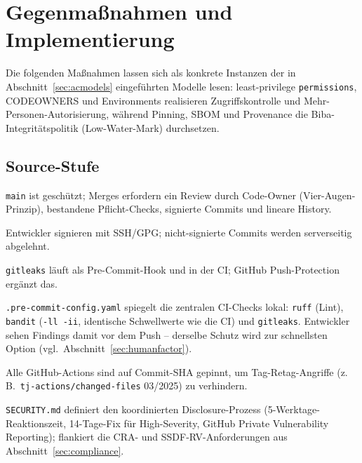 \documentclass[12pt, a4paper]{scrartcl}
\begin{document}
\section{Gegenmaßnahmen und Implementierung}\label{sec:countermeasures}
Die folgenden Maßnahmen lassen sich als konkrete Instanzen der in
Abschnitt~\ref{sec:acmodels} eingeführten Modelle lesen: least-privilege
\texttt{permissions}, CODEOWNERS und Environments realisieren
Zugriffskontrolle und Mehr-Personen-Autorisierung, während Pinning, SBOM
und Provenance die Biba-Integritätspolitik (Low-Water-Mark) durchsetzen.

\subsection{Source-Stufe}
\begin{description}[leftmargin=1.4em,style=nextline]
  \item[Branch Protection \& CODEOWNERS] \texttt{main} ist geschützt; Merges
        erfordern ein Review durch Code-Owner (Vier-Augen-Prinzip), bestandene
        Pflicht-Checks, signierte Commits und lineare History.
  \item[Signierte Commits] Entwickler signieren mit SSH/GPG; nicht-signierte
        Commits werden serverseitig abgelehnt.
  \item[Secret-Scanning] \texttt{gitleaks} läuft als Pre-Commit-Hook und in der
        CI; GitHub Push-Protection ergänzt das.
  \item[Pre-Commit-Hooks] \texttt{.pre-commit-config.yaml} spiegelt die
        zentralen CI-Checks lokal: \texttt{ruff} (Lint), \texttt{bandit}
        (\texttt{-ll~-ii}, identische Schwellwerte wie die CI) und
        \texttt{gitleaks}. Entwickler sehen Findings damit vor dem Push
        -- derselbe Schutz wird zur schnellsten Option (vgl.\
        Abschnitt~\ref{sec:humanfactor}).
  \item[Pinned Actions] Alle GitHub-Actions sind auf Commit-SHA gepinnt, um
        Tag-Retag-Angriffe (z.\,B.\ \texttt{tj-actions/changed-files} 03/2025)
        zu verhindern.
  \item[Vulnerability-Disclosure] \texttt{SECURITY.md} definiert den
        koordinierten Disclosure-Prozess (5-Werktage-Reaktionszeit,
        14-Tage-Fix für High-Severity, GitHub Private Vulnerability
        Reporting); flankiert die CRA- und SSDF-RV-Anforderungen aus
        Abschnitt~\ref{sec:compliance}.
\end{description}
\end{document}
